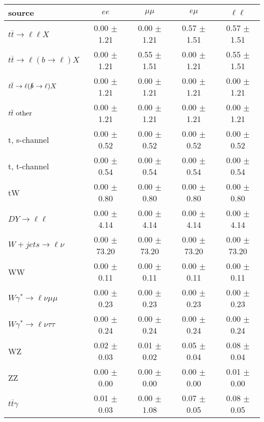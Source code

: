 \begin{tabular}{l|cccc} \hline\hline
source & $ee$ & $\mu\mu$ & $e\mu$ & $\ell\ell $ \\
\hline
$t\overline{t} \rightarrow \ell \ell X$ &  0.00 $\pm$  1.21 &  0.00 $\pm$  1.21 &  0.57 $\pm$  1.51 &  0.57 $\pm$  1.51 \\
$t\overline{t} \rightarrow \ell (b \rightarrow \ell) X$ &  0.00 $\pm$  1.21 &  0.55 $\pm$  1.51 &  0.00 $\pm$  1.21 &  0.55 $\pm$  1.51 \\
$t\overline{t} \rightarrow \ell (\slashed b \rightarrow \ell) X$ &  0.00 $\pm$  1.21 &  0.00 $\pm$  1.21 &  0.00 $\pm$  1.21 &  0.00 $\pm$  1.21 \\
        $t\overline{t}\ \rm{other}$ &  0.00 $\pm$  1.21 &  0.00 $\pm$  1.21 &  0.00 $\pm$  1.21 &  0.00 $\pm$  1.21 \\
\hline
                       t, s-channel &  0.00 $\pm$  0.52 &  0.00 $\pm$  0.52 &  0.00 $\pm$  0.52 &  0.00 $\pm$  0.52 \\
                       t, t-channel &  0.00 $\pm$  0.54 &  0.00 $\pm$  0.54 &  0.00 $\pm$  0.54 &  0.00 $\pm$  0.54 \\
                                 tW &  0.00 $\pm$  0.80 &  0.00 $\pm$  0.80 &  0.00 $\pm$  0.80 &  0.00 $\pm$  0.80 \\
\hline
         $DY \rightarrow \ell \ell$ &  0.00 $\pm$  4.14 &  0.00 $\pm$  4.14 &  0.00 $\pm$  4.14 &  0.00 $\pm$  4.14 \\
      $W+jets \rightarrow \ell \nu$ &  0.00 $\pm$ 73.20 &  0.00 $\pm$ 73.20 &  0.00 $\pm$ 73.20 &  0.00 $\pm$ 73.20 \\
                                 WW &  0.00 $\pm$  0.11 &  0.00 $\pm$  0.11 &  0.00 $\pm$  0.11 &  0.00 $\pm$  0.11 \\
\hline
$W\gamma^{*} \rightarrow \ell \nu \mu\mu$ &  0.00 $\pm$  0.23 &  0.00 $\pm$  0.23 &  0.00 $\pm$  0.23 &  0.00 $\pm$  0.23 \\
$W\gamma^{*} \rightarrow \ell \nu \tau\tau$ &  0.00 $\pm$  0.24 &  0.00 $\pm$  0.24 &  0.00 $\pm$  0.24 &  0.00 $\pm$  0.24 \\
                                 WZ &  0.02 $\pm$  0.03 &  0.01 $\pm$  0.02 &  0.05 $\pm$  0.04 &  0.08 $\pm$  0.04 \\
                                 ZZ &  0.00 $\pm$  0.00 &  0.00 $\pm$  0.00 &  0.00 $\pm$  0.00 &  0.01 $\pm$  0.00 \\
\hline
              $t\overline{t}\gamma$ &  0.01 $\pm$  0.03 &  0.00 $\pm$  1.08 &  0.07 $\pm$  0.05 &  0.08 $\pm$  0.05 \\

\end{tabular}
